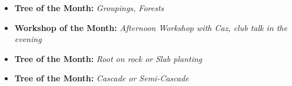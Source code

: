 
\label{2025-05-calendar}



\medskip
{}
\begin{itemize}
    \item \textbf{Tree of the Month:} \textit{Groupings, Forests}
    \item \textbf{Workshop of the Month:} \textit{Afternoon Workshop with \textit{Caz}, club talk in the evening}
\end{itemize}

\medskip
{}
\begin{itemize}
    \item \textbf{Tree of the Month:} \textit{Root on rock or Slab planting}
\end{itemize}

\medskip
{}
\begin{itemize}
    \item \textbf{Tree of the Month:} \textit{Cascade or Semi-Cascade}
\end{itemize}


